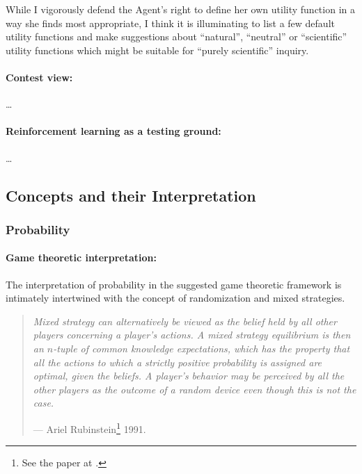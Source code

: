 \documentclass{article}
\begin{document}
While I vigorously defend the Agent's right to define her own utility function in a way she finds most appropriate, I think it is illuminating to list a few default utility functions and make suggestions about ``natural'', ``neutral'' or ``scientific'' utility functions which might be suitable for ``purely scientific'' inquiry.


\paragraph{Contest view:}
\dots


\paragraph{Reinforcement learning as a testing ground:}
\dots


\subsection*{Concepts and their Interpretation}

\subsubsection*{Probability}

\paragraph{Game theoretic interpretation:}
The interpretation of probability in the suggested game theoretic framework is intimately intertwined with the concept of randomization and mixed strategies.

    \begin{quote}
    {\it
    Mixed strategy can alternatively be viewed as the belief held by all other players concerning a player's actions. A mixed strategy equilibrium is then an $n$-tuple of common knowledge expectations, which has the property that all the actions to which a strictly positive probability is assigned are optimal, given the beliefs. A player's behavior may be perceived by all the other players as the outcome of a random device even though this is not the case.
    }
    
    \hfill --- Ariel Rubinstein\footnote{See the paper at \cite{paper:Rubinstein1991}.} 1991.
    \end{quote}
\end{document}
